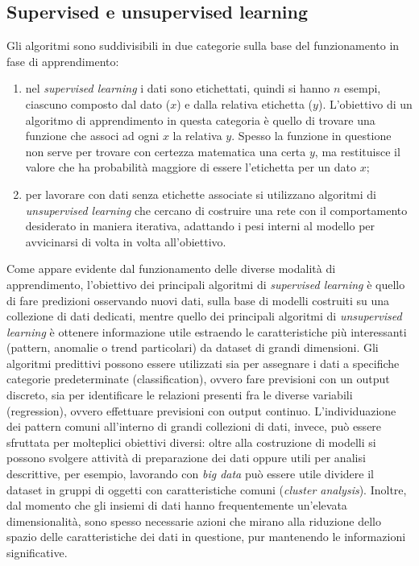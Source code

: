 \documentclass[12pt,a4paper,fleqn,titlepage]{report}
\newcommand\bd{\emph{\gls{big data}} }
\begin{document}
        \subsection{Supervised e unsupervised learning}
        Gli algoritmi sono suddivisibili in due categorie sulla base del funzionamento in fase di apprendimento:
        \begin{enumerate}
            \item nel \emph{supervised learning} i dati sono etichettati, quindi si hanno $n$ esempi, ciascuno composto dal dato ($x$) e dalla relativa etichetta ($y$). L'obiettivo di un algoritmo di apprendimento in questa categoria è quello di trovare una funzione che associ ad ogni $x$ la relativa $y$. Spesso la funzione in questione non serve per trovare con certezza matematica una certa $y$, ma restituisce il valore che ha probabilità maggiore di essere l'etichetta per un dato $x$;
            \item per lavorare con dati senza etichette associate si utilizzano algoritmi di \emph{unsupervised learning} che cercano di costruire una rete con il comportamento desiderato in maniera iterativa, adattando i pesi interni al modello per avvicinarsi di volta in volta all'obiettivo.
        \end{enumerate}
        Come appare evidente dal funzionamento delle diverse modalità di apprendimento, l'obiettivo dei principali algoritmi di \emph{supervised learning} è quello di fare predizioni osservando nuovi dati, sulla base di modelli costruiti su una collezione di dati dedicati, mentre quello dei principali algoritmi di \emph{unsupervised learning} è ottenere informazione utile estraendo le caratteristiche più interessanti (pattern, anomalie o trend particolari) da dataset di grandi dimensioni.
        Gli algoritmi predittivi possono essere utilizzati sia per assegnare i dati a specifiche categorie predeterminate (classification), ovvero fare previsioni con un output discreto, sia per identificare le relazioni presenti fra le diverse variabili (regression), ovvero effettuare previsioni con output continuo.
        L'individuazione dei pattern comuni all'interno di grandi collezioni di dati, invece, può essere sfruttata per molteplici obiettivi diversi: oltre alla costruzione di modelli si possono svolgere attività di preparazione dei dati oppure utili per analisi descrittive, per esempio, lavorando con \bd può essere utile dividere il dataset in gruppi di oggetti con caratteristiche comuni (\emph{cluster analysis}). Inoltre, dal momento che gli insiemi di dati hanno frequentemente un'elevata dimensionalità, sono spesso necessarie azioni che mirano alla riduzione dello spazio delle caratteristiche dei dati in questione, pur mantenendo le informazioni significative.
\end{document}
